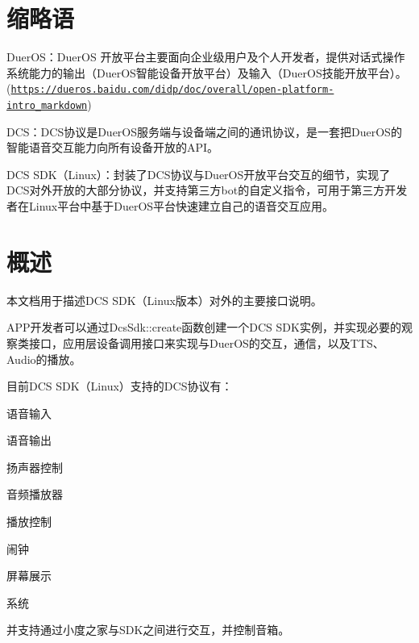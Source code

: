 \hypertarget{index_缩略语}{}\section{缩略语}\label{index_缩略语}
\begin{DoxyItemize}
\item Duer\+O\+S：\+Duer\+OS 开放平台主要面向企业级用户及个人开发者，提供对话式操作系统能力的输出（\+Duer\+O\+S智能设备开放平台）及输入（\+Duer\+O\+S技能开放平台）。(\href{https://dueros.baidu.com/didp/doc/overall/open-platform-intro_markdown}{\tt https\+://dueros.\+baidu.\+com/didp/doc/overall/open-\/platform-\/intro\+\_\+markdown}) \item D\+C\+S：\+D\+C\+S协议是\+Duer\+O\+S服务端与设备端之间的通讯协议，是一套把\+Duer\+O\+S的智能语音交互能力向所有设备开放的\+A\+P\+I。 \item D\+CS S\+D\+K（\+Linux）：封装了\+D\+C\+S协议与\+Duer\+O\+S开放平台交互的细节，实现了\+D\+C\+S对外开放的大部分协议，并支持第三方bot的自定义指令，可用于第三方开发者在\+Linux平台中基于\+Duer\+O\+S平台快速建立自己的语音交互应用。 \end{DoxyItemize}
\hypertarget{index_概述}{}\section{概述}\label{index_概述}
本文档用于描述\+D\+CS S\+D\+K（\+Linux版本）对外的主要接口说明。 

A\+P\+P开发者可以通过\+Dcs\+Sdk\+::create函数创建一个\+D\+CS S\+D\+K实例，并实现必要的观察类接口，应用层设备调用接口来实现与\+Duer\+O\+S的交互，通信，以及\+T\+T\+S、\+Audio的播放。 

目前\+D\+CS S\+D\+K（\+Linux）支持的\+D\+C\+S协议有： \begin{DoxyItemize}
\item 语音输入 \item 语音输出 \item 扬声器控制 \item 音频播放器 \item 播放控制 \item 闹钟 \item 屏幕展示 \item 系统 \end{DoxyItemize}


并支持通过小度之家与\+S\+D\+K之间进行交互，并控制音箱。 
\begin{DoxyCodeInclude}

\end{DoxyCodeInclude}
 